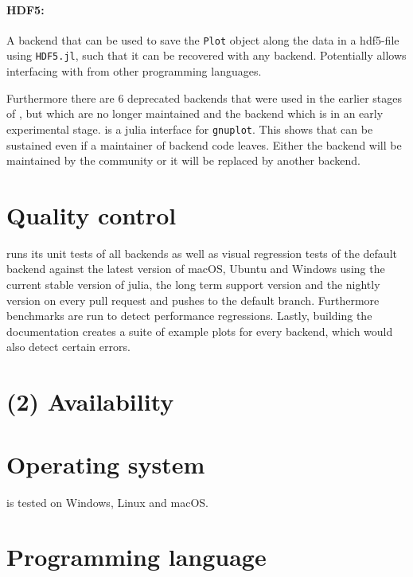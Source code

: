 \paragraph{HDF5:}
A backend that can be used to save the \texttt{Plot} object along the data in a hdf5-file using \texttt{HDF5.jl}\cite{HomeHDF5Jl}, such that it can be recovered with any backend.
Potentially allows interfacing with \Plots from other programming languages.

\vspace{1em}
Furthermore there are 6 deprecated backends that were used in the earlier stages of \Plots, but which are no longer maintained and the  backend which is in an early experimental stage.
 is a julia interface for \texttt{gnuplot}\cite{GnuplotHomepage}.
This shows that \Plots can be sustained even if a maintainer of backend code leaves.
Either the backend will be maintained by the community or it will be replaced by another backend.


\section*{Quality control}


\Plots runs its unit tests of all backends as well as visual regression tests of the default backend against the latest version of macOS, Ubuntu and Windows using the current stable version of julia, the long term support version and the nightly version on every pull request and pushes to the default branch.
Furthermore benchmarks are run to detect performance regressions.
Lastly, building the documentation creates a suite of example plots for every backend, which would also detect certain errors.

\section*{(2) Availability}
\vspace{0.5cm}
\section*{Operating system}

\Plots is tested on Windows, Linux and macOS.


\section*{Programming language}

